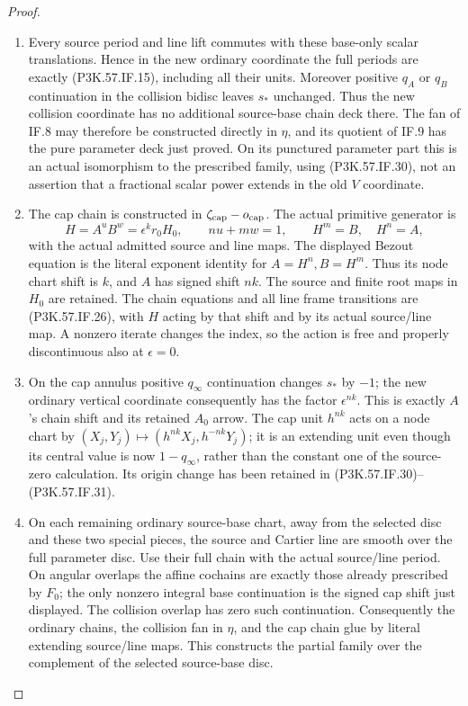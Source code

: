 \begin{proof}
\begin{enumerate}[label=\arabic*.]
\item Every source period and line lift commutes with these base-only scalar
translations. Hence in the new ordinary coordinate the full periods
are exactly (P3K.57.IF.15), including all their units. Moreover positive
\(q_A\) or \(q_B\) continuation in the collision bidisc leaves \(s_*\)
unchanged. Thus the new collision coordinate has no additional
source-base chain deck there. The fan of IF.8 may therefore be
constructed directly in \(\eta\), and its quotient of IF.9 has the
pure parameter deck just proved. On its punctured parameter part
this is an actual isomorphism to the prescribed family, using
(P3K.57.IF.30), not an assertion that a fractional scalar power extends in
the old \(V\) coordinate.

\item The cap chain is constructed in \(\zeta_{\rm cap}-o_{\rm cap}\).
The actual primitive generator is
\[
 H=A^uB^w=\epsilon^k r_0H_0,\qquad nu+mw=1,
 \qquad H^m=B,\quad H^n=A ,
\]
with the actual admitted source and line maps. The displayed Bezout
equation is the literal exponent identity for \(A=H^n,B=H^m\).
Thus its node chart shift is
\(k\), and \(A\) has signed shift \(nk\). The source and finite
root maps in \(H_0\) are retained. The chain equations and all line
frame transitions are (P3K.57.IF.26), with \(H\) acting by that shift and
by its actual source/line map. A nonzero iterate changes the index,
so the action is free and properly discontinuous also at
\(\epsilon=0\).

\item On the cap annulus positive \(q_\infty\) continuation changes
\(s_*\) by \(-1\); the new ordinary vertical coordinate consequently
has the factor \(\epsilon^{nk}\). This is exactly \(A\)'s chain
shift and its retained \(A_0\) arrow. The cap unit \(h^{nk}\) acts
on a node chart by
\((X_j,Y_j)\mapsto(h^{nk}X_j,h^{-nk}Y_j)\); it is an extending
unit even though its central value is now \(1-q_\infty\), rather
than the constant one of the source-zero calculation. Its origin
change has been retained in (P3K.57.IF.30)--\allowbreak (P3K.57.IF.31).

\item On each remaining ordinary source-base chart, away from the selected
disc and these two special pieces, the source and Cartier line are
smooth over the full parameter disc. Use their full chain with the
actual source/line period. On angular overlaps the affine cochains
are exactly those already prescribed by \(F_0\); the only nonzero
integral base continuation is the signed cap shift just displayed.
The collision overlap has zero such continuation. Consequently
the ordinary chains, the collision fan in \(\eta\), and the cap
chain glue by literal extending source/line maps. This constructs
the partial family over the complement of the selected source-base
disc.


\end{enumerate}
\end{proof}
